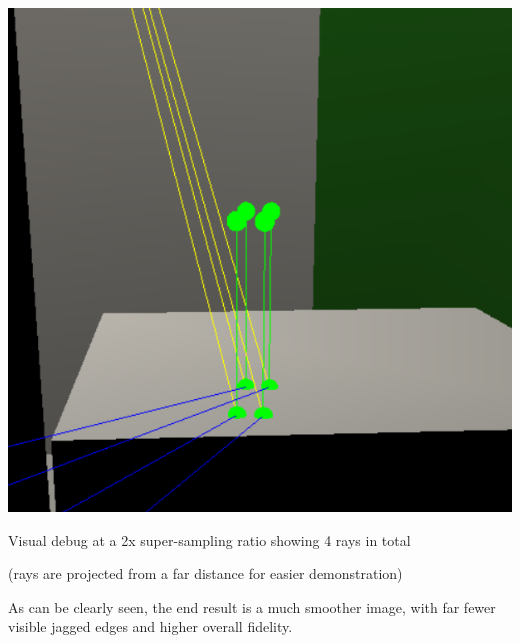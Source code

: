 \documentclass{article}
\begin{document}
    \begin{center}
        \includegraphics[scale=0.80]{images/supersampling_debugger.png}

        {\footnotesize Visual debug at a 2x super-sampling ratio showing 4 rays in total
        
        (rays are projected from a far distance for easier demonstration)\par}
    \end{center}

    As can be clearly seen, the end result is a much smoother image,
    with far fewer visible jagged edges and higher overall fidelity.

    \newpage
    
\end{document}
